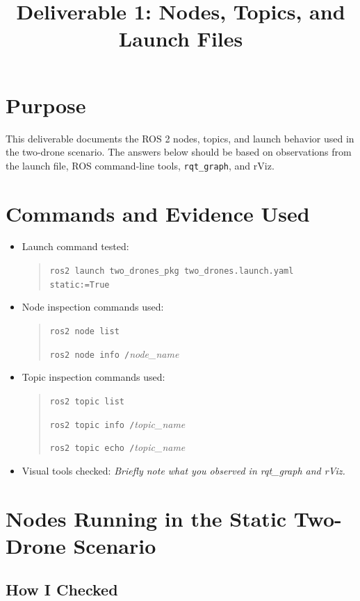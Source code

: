 \documentclass[11pt]{article}
\title{Deliverable 1: Nodes, Topics, and Launch Files}
\author{\placeholder{Your name}}
\date{\placeholder{Course / date}}
\newcommand{\placeholder}[1]{\textit{#1}}
\newcommand{\cmd}[1]{\texttt{#1}}
\begin{document}
\maketitle

\section*{Purpose}

This deliverable documents the ROS 2 nodes, topics, and launch behavior used in
the two-drone scenario. The answers below should be based on observations from
the launch file, ROS command-line tools, \cmd{rqt\_graph}, and rViz.

\section*{Commands and Evidence Used}

\begin{itemize}
  \item Launch command tested:
    \begin{quote}
      \cmd{ros2 launch two\_drones\_pkg two\_drones.launch.yaml static:=True}
    \end{quote}
  \item Node inspection commands used:
    \begin{quote}
      \cmd{ros2 node list}

      \cmd{ros2 node info /}\placeholder{node\_name}
    \end{quote}
  \item Topic inspection commands used:
    \begin{quote}
      \cmd{ros2 topic list}

      \cmd{ros2 topic info /}\placeholder{topic\_name}

      \cmd{ros2 topic echo /}\placeholder{topic\_name}
    \end{quote}
  \item Visual tools checked:
    \placeholder{Briefly note what you observed in rqt\_graph and rViz.}
\end{itemize}

\section{Nodes Running in the Static Two-Drone Scenario}

\subsection*{How I Checked}
\end{document}

